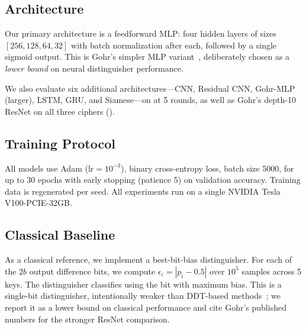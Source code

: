 \subsection{Architecture}
\label{sec:architecture}

Our primary architecture is a feedforward MLP: four hidden layers of sizes $[256, 128, 64, 32]$ with batch normalization after each, followed by a single sigmoid output.
This is Gohr's simpler MLP variant~\citep{gohr2019}, deliberately chosen as a \emph{lower bound} on neural distinguisher performance.

We also evaluate six additional architectures---CNN, Residual CNN, Gohr-MLP (larger), LSTM, GRU, and Siamese---on \speck at 5 rounds, as well as Gohr's depth-10 ResNet on all three ciphers ().

\subsection{Training Protocol}

All models use Adam ($\text{lr} = 10^{-3}$), binary cross-entropy loss, batch size 5000, for up to 30 epochs with early stopping (patience 5) on validation accuracy.
Training data is regenerated per seed.
All experiments run on a single NVIDIA Tesla V100-PCIE-32GB.

\subsection{Classical Baseline}

As a classical reference, we implement a best-bit-bias distinguisher.
For each of the $2b$ output difference bits, we compute $\epsilon_i = |p_i - 0.5|$ over $10^5$ samples across 5 keys.
The distinguisher classifies using the bit with maximum bias.
This is a single-bit distinguisher, intentionally weaker than DDT-based methods~\citep{gohr2022assessment}; we report it as a lower bound on classical performance and cite Gohr's published numbers for the stronger ResNet comparison.
